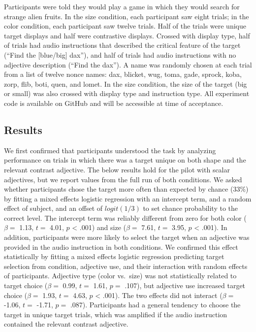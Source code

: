 \documentclass[10pt, letterpaper]{article}
\begin{document}
Participants were told they would play a game in which they would search
for strange alien fruits. In the size condition, each participant saw
eight trials; in the color condition, each participant saw twelve
trials. Half of the trials were unique target displays and half were
contrastive displays. Crossed with display type, half of trials had
audio instructions that described the critical feature of the target
(``Find the {[}blue/big{]} dax''), and half of trials had audio
instructions with no adjective description (``Find the dax''). A name
was randomly chosen at each trial from a list of twelve nonce names:
dax, blicket, wug, toma, gade, sprock, koba, zorp, flib, boti, quen, and
lomet. In the size condition, the size of the target (big or small) was
also crossed with display type and instruction type. All experiment code
is available on GitHub and will be accessible at time of acceptance.

\subsection{Results}\label{results}

We first confirmed that participants understood the task by analyzing
performance on trials in which there was a target unique on both shape
and the relevant contrast adjective. The below results hold for the
pilot with scalar adjectives, but we report values from the full run of
both conditions. We asked whether participants chose the target more
often than expected by chance (\(33\%\)) by fitting a mixed effects
logistic regression with an intercept term, and a random effect of
subject, and an offset of \(logit(1/3)\) to set chance probability to
the correct level. The intercept term was reliably different from zero
for both color (\(\beta =\) 1.13, \(t =\) 4.01, \(p\) \textless{} .001)
and size (\(\beta =\) 7.61, \(t =\) 3.95, \(p\) \textless{} .001). In
addition, participants were more likely to select the target when an
adjective was provided in the audio instruction in both conditions. We
confirmed this effect statistically by fitting a mixed effects logistic
regression predicting target selection from condition, adjective use,
and their interaction with random effects of participants. Adjective
type (color vs.~size) was not statistically related to target choice
(\(\beta =\) 0.99, \(t =\) 1.61, \(p =\) .107), but adjective use
increased target choice (\(\beta =\) 1.93, \(t =\) 4.63, \(p\)
\textless{} .001). The two effects did not interact (\(\beta =\) -1.06,
\(t =\) -1.71, \(p =\) .087). Participants had a general tendency to
choose the target in unique target trials, which was amplified if the
audio instruction contained the relevant contrast adjective.
\end{document}
